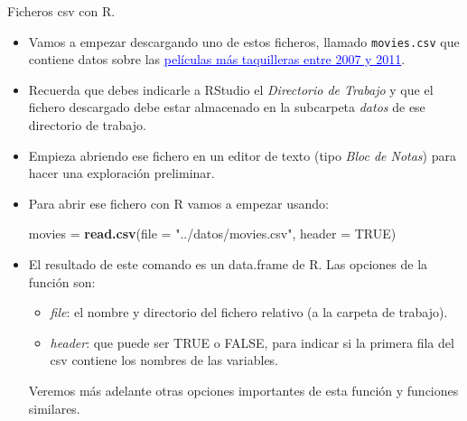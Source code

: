 \documentclass[
  9pt,
  ignorenonframetext,
]{beamer}
\newenvironment{Shaded}{\begin{snugshade}}{\end{snugshade}}
\newcommand{\DataTypeTok}[1]{\textcolor[rgb]{0.13,0.29,0.53}{#1}}
\newcommand{\KeywordTok}[1]{\textcolor[rgb]{0.13,0.29,0.53}{\textbf{#1}}}
\newcommand{\NormalTok}[1]{#1}
\newcommand{\OtherTok}[1]{\textcolor[rgb]{0.56,0.35,0.01}{#1}}
\newcommand{\StringTok}[1]{\textcolor[rgb]{0.31,0.60,0.02}{#1}}
\providecommand{\tightlist}{%
  \setlength{\itemsep}{0pt}\setlength{\parskip}{0pt}}
\begin{document}
\begin{frame}[fragile]{Ficheros csv con R.}
\protect\hypertarget{ficheros-csv-con-r.}{}

\begin{itemize}
\item
  Vamos a empezar descargando uno de estos ficheros, llamado
  \texttt{movies.csv} que contiene datos sobre las
  \href{https://gist.githubusercontent.com/tiangechen/b68782efa49a16edaf07dc2cdaa855ea/raw/0c794a9717f18b094eabab2cd6a6b9a226903577/movies.csv}{\textcolor{blue}{\underline{películas más taquilleras  entre 2007 y 2011}}}.
\item
  Recuerda que debes indicarle a RStudio el \emph{Directorio de Trabajo}
  y que el fichero descargado debe estar almacenado en la subcarpeta
  \emph{datos} de ese directorio de trabajo.
\item
  Empieza abriendo ese fichero en un editor de texto (tipo \emph{Bloc de
  Notas}) para hacer una exploración preliminar.
\item
  Para abrir ese fichero con R vamos a empezar usando: \small

\begin{Shaded}
\begin{Highlighting}[]
\NormalTok{movies =}\StringTok{ }\KeywordTok{read.csv}\NormalTok{(}\DataTypeTok{file =} \StringTok{"../datos/movies.csv"}\NormalTok{, }\DataTypeTok{header =} \OtherTok{TRUE}\NormalTok{)}
\end{Highlighting}
\end{Shaded}
\end{itemize}

\normalsize

\begin{itemize}
\item
  El resultado de este comando es un data.frame de R. Las opciones de la
  función son:

  \begin{itemize}
  \tightlist
  \item
    \emph{file}: el nombre y directorio del fichero relativo (a la
    carpeta de trabajo).
  \item
    \emph{header}: que puede ser TRUE o FALSE, para indicar si la
    primera fila del csv contiene los nombres de las variables.
  \end{itemize}

  Veremos más adelante otras opciones importantes de esta función y
  funciones similares.
\end{itemize}

\end{frame}
\end{document}
